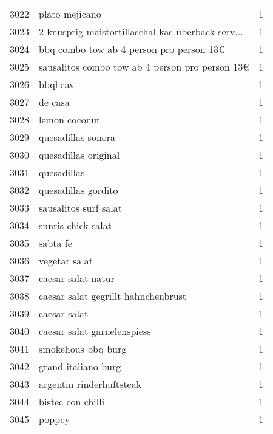 \begin{tabular}{llr}
3022 &                                     plato mejicano &      1 \\
3023 &  2 knusprig maistortillaschal kas uberback serv... &      1 \\
3024 &           bbq combo tow ab 4 person pro person 13€ &      1 \\
3025 &    sausalitos combo tow ab 4 person pro person 13€ &      1 \\
3026 &                                            bbqheav &      1 \\
3027 &                                            de casa &      1 \\
3028 &                                      lemon coconut &      1 \\
3029 &                                 quesadillas sonora &      1 \\
3030 &                               quesadillas original &      1 \\
3031 &                                        quesadillas &      1 \\
3032 &                                quesadillas gordito &      1 \\
3033 &                              sausalitos surf salat &      1 \\
3034 &                                 sunris chick salat &      1 \\
3035 &                                           sabta fe &      1 \\
3036 &                                      vegetar salat &      1 \\
3037 &                                 caesar salat natur &      1 \\
3038 &                caesar salat gegrillt hahnchenbrust &      1 \\
3039 &                                       caesar salat &      1 \\
3040 &                        caesar salat garnelenspiess &      1 \\
3041 &                                 smokehous bbq burg &      1 \\
3042 &                                grand italiano burg &      1 \\
3043 &                           argentin rinderhuftsteak &      1 \\
3044 &                                  bistec con chilli &      1 \\
3045 &                                             poppey &      1 \\

\end{tabular}
